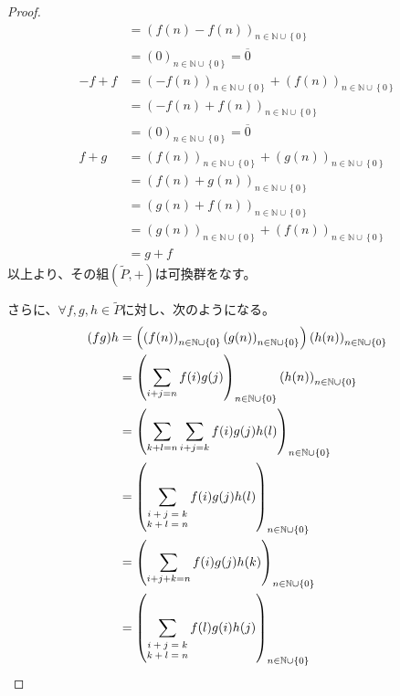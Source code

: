 \documentclass[dvipdfmx]{jsarticle}
\begin{document}
\begin{proof}
\begin{align*}
&= \left( f(n) - f(n) \right)_{n \in \mathbb{N} \cup \left\{ 0 \right\}}\\
&= (0)_{n \in \mathbb{N} \cup \left\{ 0 \right\}} = \overline{0}\\
- f + f &= \left( - f(n) \right)_{n \in \mathbb{N} \cup \left\{ 0 \right\}} + \left( f(n) \right)_{n \in \mathbb{N} \cup \left\{ 0 \right\}}\\
&= \left( - f(n) + f(n) \right)_{n \in \mathbb{N} \cup \left\{ 0 \right\}}\\
&= (0)_{n \in \mathbb{N} \cup \left\{ 0 \right\}} = \overline{0}\\
f + g &= \left( f(n) \right)_{n \in \mathbb{N} \cup \left\{ 0 \right\}} + \left( g(n) \right)_{n \in \mathbb{N} \cup \left\{ 0 \right\}}\\
&= \left( f(n) + g(n) \right)_{n \in \mathbb{N} \cup \left\{ 0 \right\}}\\
&= \left( g(n) + f(n) \right)_{n \in \mathbb{N} \cup \left\{ 0 \right\}}\\
&= \left( g(n) \right)_{n \in \mathbb{N} \cup \left\{ 0 \right\}} + \left( f(n) \right)_{n \in \mathbb{N} \cup \left\{ 0 \right\}}\\
&= g + f
\end{align*}
以上より、その組$\left( \widetilde{P}, + \right)$は可換群をなす。\par
さらに、$\forall f,g,h \in \widetilde{P}$に対し、次のようになる。
\begin{align*}
(fg)h &= \left( \left( f(n) \right)_{n \in \mathbb{N} \cup \left\{ 0 \right\}}\left( g(n) \right)_{n \in \mathbb{N} \cup \left\{ 0 \right\}} \right)\left( h(n) \right)_{n \in \mathbb{N} \cup \left\{ 0 \right\}}\\
&= \left( \sum_{i + j = n} {f(i)g(j)} \right)_{n \in \mathbb{N} \cup \left\{ 0 \right\}}\left( h(n) \right)_{n \in \mathbb{N} \cup \left\{ 0 \right\}}\\
&= \left( \sum_{k\text{+}l = n} {\sum_{i + j = k} {f(i)g(j)}h(l)} \right)_{n \in \mathbb{N} \cup \left\{ 0 \right\}}\\
&= \left( \sum_{\scriptsize \begin{matrix} i + j = k \\k + l = n \end{matrix}} {f(i)g(j)h(l)} \right)_{n \in \mathbb{N} \cup \left\{ 0 \right\}}\\
&= \left( \sum_{i + j + k = n } {f(i)g(j)h(k)} \right)_{n \in \mathbb{N} \cup \left\{ 0 \right\}}\\
&= \left( \sum_{\scriptsize \begin{matrix} i + j = k \\k + l = n \end{matrix}} {f(l)g(i)h(j)} \right)_{n \in \mathbb{N} \cup \left\{ 0 \right\}}\\

\end{align*}
\end{proof}
\end{document}
